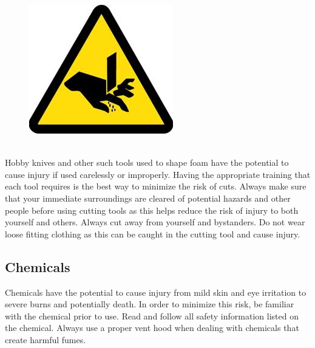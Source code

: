 \begin{framed}
\begin{figure}
\includegraphics[width=\linewidth]{images/cut_hazard.jpg}
\end{figure}
\ \\
Hobby knives and other such tools used to shape foam have the potential to cause injury if used carelessly or improperly. Having the appropriate training that each tool requires is the best way to minimize the risk of cuts. Always make sure that your immediate surroundings are cleared of potential hazards and other people before using cutting tools as this helps reduce the risk of injury to both yourself and others. Always cut away from yourself and bystanders. Do not wear loose fitting clothing as this can be caught in the cutting tool and cause injury.  
\end{framed}

\subsection{Chemicals}
Chemicals have the potential to cause injury from mild skin and eye irritation to severe burns and potentially death. In order to minimize this risk, be familiar with the chemical prior to use. Read and follow all safety information listed on the chemical. Always use a proper vent hood when dealing with chemicals that create harmful fumes.

